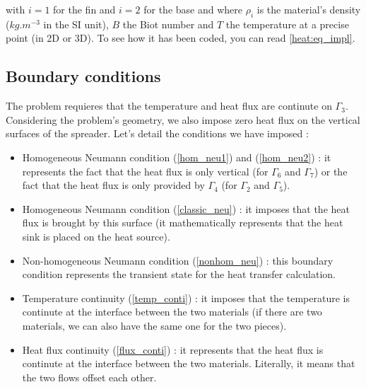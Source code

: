 \noindent with $i=1$ for the fin and $i=2$ for the base and where $\rho_i$ is the material's density ($kg.m^{-3}$ in the SI unit), $B$ the Biot number and $T$ the temperature at a precise point (in 2D or 3D). To see how it has been coded, you can read \ref{heat:eq_impl}.

%


\subsection{Boundary conditions}
\label{heat:bc}
The problem requieres that the temperature and heat flux are continute on $\Gamma_3$. Considering the problem's geometry, we also impose zero heat flux on the vertical surfaces of the spreader. Let's detail the conditions we have imposed :
\begin{itemize}
\item Homogeneous Neumann condition (\ref{hom_neu1}) and (\ref{hom_neu2}) : it represents the fact that the heat flux is only vertical (for $\Gamma_6$ and $\Gamma_7$) or the fact that the heat flux is only provided by $\Gamma_4$ (for $\Gamma_2$ and $\Gamma_5$).

\item Homogeneous Neumann condition (\ref{classic_neu}) : it imposes that the heat flux is brought by this surface (it mathematically represents that the heat sink is placed on the heat source).

\item Non-homogeneous Neumann condition (\ref{nonhom_neu}) :  this boundary condition represents the transient state for the heat transfer calculation.

\item Temperature continuity (\ref{temp_conti}) : it imposes that the temperature is continute at the interface between the two materials (if there are two materials, we can also have the same one for the two pieces).

\item Heat flux continuity (\ref{flux_conti}) : it represents that the heat flux is continute at the interface between the two materials. Literally, it means that the two flows offset each other.

\end{itemize}

